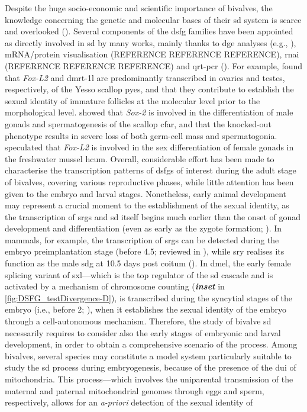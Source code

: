 Despite the huge socio-economic and scientific importance of bivalves, the knowledge concerning the genetic and molecular bases of their \gls{sd} system is scarce and overlooked (). Several components of the \gls{dsfg} families have been appointed as directly involved in \gls{sd} by many works, mainly thanks to \gls{dge} analyses (e.g., ), mRNA/protein visualisation (REFERENCE REFERENCE REFERENCE), \gls{rnai} (REFERENCE REFERENCE REFERENCE) and \gls{qrt-pcr} (). For example,  found that \textit{Fox-L2} and \gls{dmrt-1l} are predominantly transcribed in ovaries and testes, respectively, of the Yesso scallop \gls{pyes}, and that they contribute to establish the sexual identity of immature follicles at the molecular level prior to the morphological level.  showed that \textit{Sox-2} is involved in the differentiation of male gonads and spermatogenesis of the scallop \gls{cfar}, and that the knocked-out phenotype results in severe loss of both germ-cell mass and spermatogonia.  speculated that \textit{Fox-L2} is involved in the sex differentiation of female gonads in the freshwater mussel \gls{hcum}. Overall, considerable effort has been made to characterise the transcription patterns of \glspl{dsfg} of interest during the adult stage of bivalves, covering various reproductive phases, while little attention has been given to the embryo and larval stages. Nonetheless, early animal development may represent a crucial moment to the establishment of the sexual identity, as the transcription of \glspl{srg} and \gls{sd} itself begins much earlier than the onset of gonad development and differentiation (even as early as the zygote formation; ). In mammals, for example, the transcription of \glspl{srg} can be detected during the embryo preimplantation stage (before \qty{4.5}{\dpf}; reviewed in ), while \gls{sry} realises its function as the male \gls{sdg} at 10.5 days post coitum (). In \gls{dmel}, the early female splicing variant of \gls{sxl}---which is the top regulator of the \gls{sd} cascade and is activated by a mechanism of chromosome counting (\textbf{\textit{inset}} in \cref{fig:DSFG_testDivergence-D}), is transcribed during the syncytial stages of the embryo (i.e., before \qty{2}{\hpf}; ), when it establishes the sexual identity of the embryo through a cell-autonomous mechanism. Therefore, the study of bivalve \gls{sd} necessarily requires to consider also the early stages of embryonic and larval development, in order to obtain a comprehensive scenario of the process. Among bivalves, several species may constitute a model system particularly suitable to study the \gls{sd} process during embryogenesis, because of the presence of the \gls{dui} of mitochondria. This process---which involves the uniparental transmission of the maternal and paternal mitochondrial genomes through eggs and sperm, respectively, allows for an \textit{a-priori} detection of the sexual identity of 